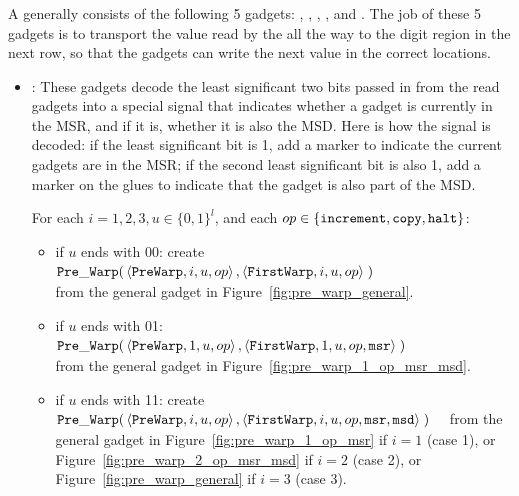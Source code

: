 \subsubsection{\warpunit}

%
A {\warpunit} generally consists of the following 5 gadgets: \prewarp, \firstwarp, \warpbridge, \secondwarp, and \postwarp.
%
The job of these 5 gadgets is to transport the value read by the {\cread} all the way to the digit region in the next row, so that the {\cwrite} gadgets can write the next value in the correct locations.
%


\begin{itemize}

    \item {\prewarp}:
    These gadgets decode the least significant two bits passed in from the read {\cread} gadgets into a special signal that indicates whether a gadget is currently in the MSR, and if it is, whether it is also the MSD.
    Here is how the signal is decoded: if the least significant bit is 1, add a marker to indicate the current gadgets are in the MSR; if the second least significant bit is also 1, add a marker on the glues to indicate that the gadget is also part of the MSD.

    For each $i = 1,2,3, u \in \{0, 1\}^l$, and each $op \in \{ {\tt increment}, {\tt copy}, {\tt halt} \}$:
    \begin{itemize}
        \item if $u$ ends with 00:
        create
        $\begin{aligned}[t]
            {\tt Pre\_Warp}(& \left\langle {\tt PreWarp},   i, u, op \right\rangle,
                       \left\langle {\tt FirstWarp}, i, u, op \right\rangle \;)
        \end{aligned}$ \\ from the general gadget in Figure~\ref{fig:pre_warp_general}.

        \item if $u$ ends with 01:
        $\begin{aligned}[t]
            {\tt Pre\_Warp}(& \left\langle {\tt PreWarp},   1, u, op            \right\rangle,
                       \left\langle {\tt FirstWarp}, 1, u, op, {\tt msr} \right\rangle \;)
        \end{aligned}$ \\ from the general gadget in Figure~\ref{fig:pre_warp_1_op_msr_msd}.

        \item if $u$ ends with 11:
        create
        $\begin{aligned}[t]
            {\tt Pre\_Warp}(& \left\langle {\tt PreWarp},   i, u, op                       \right\rangle,
                       \left\langle {\tt FirstWarp}, i, u, op, {\tt msr}, {\tt msd} \right\rangle \;)
        \end{aligned}$ from the general gadget in Figure~\ref{fig:pre_warp_1_op_msr} if $i = 1$ (case 1),
        or Figure~\ref{fig:pre_warp_2_op_msr_msd} if $i = 2$ (case 2), or Figure~\ref{fig:pre_warp_general} if $i = 3$ (case 3).
    \end{itemize}
    \vspace{.5cm}


\end{itemize}

